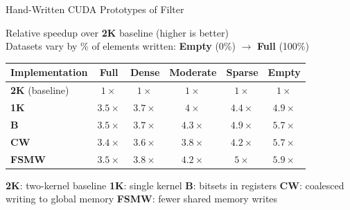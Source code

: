 \documentclass[aspectratio=169]{beamer}
\begin{document}
\begin{frame}{Hand-Written CUDA Prototypes of Filter}
\begin{center}
  \small Relative speedup over \textbf{2K} baseline (higher is better) \\[0.5em]
  \small Datasets vary by \% of elements written: \textbf{Empty} (0\%) $\to$ \textbf{Full} (100\%) \\[1em]
{\Large
  \begin{tabular}{l|c|c|c|c|c}
  \textbf{Implementation} & \textbf{Full} & \textbf{Dense} & \textbf{Moderate} &
  \textbf{Sparse} & \textbf{Empty} \\
  \hline
  \textbf{2K} (baseline) & $1\times$ & $1\times$ & $1\times$ & $1\times$ & $1\times$ \\
  \textbf{1K} & $3.5\times$ & $3.7\times$ & $4\times$ & $4.4\times$ & $4.9\times$ \\
  \textbf{B} & $3.5\times$ & $3.7\times$ & $4.3\times$ & $4.9\times$ & $5.7\times$ \\
  \textbf{CW} & $3.4\times$ & $3.6\times$ & $3.8\times$ & $4.2\times$ & $5.7\times$ \\
  \textbf{FSMW} & $3.5\times$ & $3.8\times$ & $4.2\times$ & $5\times$ & $5.9\times$ \\
\end{tabular}
}
\end{center}
\vfill
\begin{center}
\tiny
\textbf{2K}: two-kernel baseline \quad
\textbf{1K}: single kernel \quad
\textbf{B}: bitsets in registers \quad
\textbf{CW}: coalesced writing to global memory \quad
\textbf{FSMW}: fewer shared memory writes
\end{center}
\end{frame}
\end{document}
